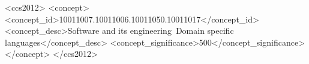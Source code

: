 \documentclass[sigplan]{acmart}
\begin{document}
%
%
 \begin{CCSXML}
	<ccs2012>
	<concept>
	<concept_id>10011007.10011006.10011050.10011017</concept_id>
	<concept_desc>Software and its engineering~Domain specific languages</concept_desc>
	<concept_significance>500</concept_significance>
	</concept>
	</ccs2012>
\end{CCSXML}




\maketitle
\end{document}
